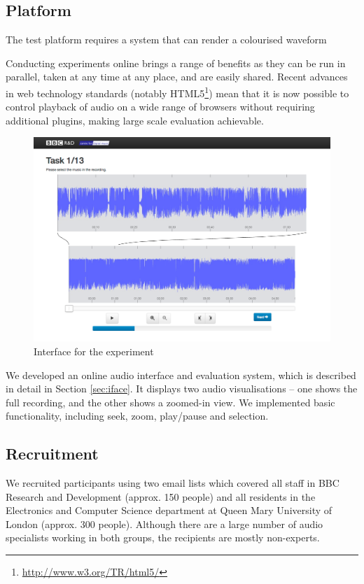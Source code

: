 \subsection{Platform}
The test platform requires a system that can render a colourised waveform

Conducting experiments online brings a range of benefits as they can be run in parallel, taken at any time at any
place, and are easily shared. Recent advances in web technology standards (notably
HTML5\footnote{\url{http://www.w3.org/TR/html5/}}) mean that it is now possible to control playback of audio on a wide
range of browsers without requiring additional plugins, making large scale evaluation achievable.

\begin{figure}[ht]
  \centering
  \includegraphics[width=\textwidth]{figs/waveform-interface.png}
  \caption{Interface for the experiment}
  \label{fig:colourised-interface}
\end{figure}

We developed an online audio interface and evaluation system, which is described in detail in Section \ref{sec:iface}.
It displays two audio visualisations -- one shows the full recording, and the other shows a zoomed-in view. We
implemented basic functionality, including seek, zoom, play/pause and selection.

\subsection{Recruitment}\label{sec:colourised-recruitment}
We recruited participants using two email lists which covered all staff in BBC Research and Development (approx. 150
people) and all residents in the Electronics and Computer Science department at Queen Mary University of London
(approx. 300 people). Although there are a large number of audio specialists working in both groups, the recipients are
mostly non-experts.

